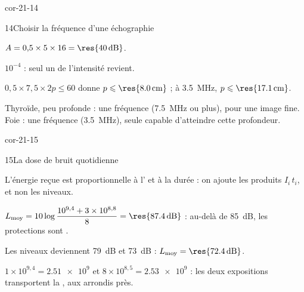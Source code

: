\begin{blocLivre}{cor-21-14}
\begin{corrige}{14}{Choisir la fréquence d'une échographie}
\begin{questions}
\item $A=0{,}5\times5\times16=\res{\qty{40}{dB}}$.
\item $10^{-4}$ : seul un  de l'intensité revient.
\item $0{,}5\times7{,}5\times2p\leqslant60$ donne $p\leqslant\res{\qty{8,0}{cm}}$ ; à \qty{3,5}{MHz}, $p\leqslant\res{\qty{17,1}{cm}}$.
\item Thyroïde, peu profonde : une fréquence  (\qty{7,5}{MHz} ou plus), pour une image fine. Foie : une
fréquence  (\qty{3,5}{MHz}), seule capable d'atteindre cette profondeur.
\end{questions}
\end{corrige}
\end{blocLivre}
\begin{blocLivre}{cor-21-15}
\begin{corrige}{15}{La dose de bruit quotidienne}
\begin{questions}
\item L'énergie reçue est proportionnelle à l' et à la durée : on ajoute les produits $I_i\,t_i$, et non
les niveaux.
\item $L_\mathrm{moy}=10\log\dfrac{10^{9{,}4}+3\times10^{8{,}8}}{8}=\res{\qty{87,4}{dB}}$ : au-delà de \qty{85}{dB}, les protections sont
.
\item Les niveaux deviennent \qty{79}{dB} et \qty{73}{dB} : $L_\mathrm{moy}=\res{\qty{72,4}{dB}}$.
\item $1\times10^{9{,}4}=\num{2.51e9}$ et $8\times10^{8{,}5}=\num{2.53e9}$ : les deux expositions transportent la
, aux arrondis près.
\end{questions}
\end{corrige}
\end{blocLivre}
